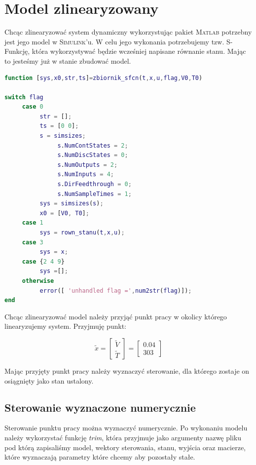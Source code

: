 \documentclass[12pt]{article}
\begin{document}
\newpage

\section{Model zlinearyzowany}

Chcąc zlinearyzować system dynamiczny wykorzystując pakiet \textsc{Matlab}
potrzebny jest jego model w \textsc{Simulink}'u. W celu jego wykonania
potrzebujemy tzw. S-Funkcję, która wykorzystywać będzie wcześniej napisane
równanie stanu. Mając to jesteśmy już w stanie zbudować model.

\begin{lstlisting}[language=matlab]
function [sys,x0,str,ts]=zbiornik_sfcn(t,x,u,flag,V0,T0) 

switch flag 
     case 0
          str = []; 
          ts = [0 0]; 
          s = simsizes; 
               s.NumContStates = 2;
               s.NumDiscStates = 0;
               s.NumOutputs = 2;
               s.NumInputs = 4;
               s.DirFeedthrough = 0;
               s.NumSampleTimes = 1;
          sys = simsizes(s); 
          x0 = [V0, T0]; 
     case 1
          sys = rown_stanu(t,x,u); 
     case 3
          sys = x; 
     case {2 4 9} 
          sys =[]; 
     otherwise 
          error([ 'unhandled flag =',num2str(flag)]); 
end 
\end{lstlisting}

Chcąc zlinearyzować model należy przyjąć punkt pracy w okolicy którego
linearyzujemy system. Przyjmuję punkt:

\begin{equation*}
	\tilde{x} =
	\begin{bmatrix}
		\tilde{V} \\
		\tilde{T}
	\end{bmatrix} =
	\begin{bmatrix}
		0.04 \\
		303
	\end{bmatrix}
\end{equation*}

Mając przyjęty punkt pracy należy wyznaczyć sterowanie, dla którego zostaje on
osiągnięty jako stan ustalony.

\newpage

\subsection{Sterowanie wyznaczone numerycznie}

Sterowanie punktu pracy można wyznaczyć numerycznie. Po wykonaniu modelu należy
wykorzystać funkcję \textit{trim}, która przyjmuje jako argumenty nazwę pliku
pod którą zapisaliśmy model, wektory sterowania, stanu, wyjścia oraz macierze,
które wyznaczają parametry które chcemy aby pozostały stałe.
\end{document}
